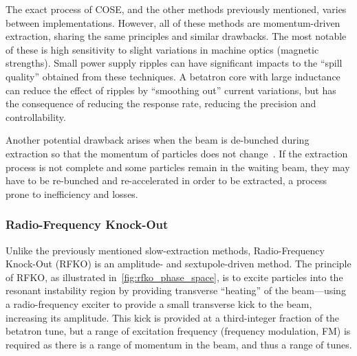 \documentclass[11pt]{report}
\begin{document}
The exact process of COSE, and the other methods previously mentioned, varies between implementations. However, all of these methods are momentum-driven extraction, sharing the same principles and similar drawbacks. The most notable of these is high sensitivity to slight variations in machine optics (magnetic strengths). Small power supply ripples can have significant impacts to the ``spill quality'' obtained from these techniques. A betatron core with large inductance can reduce the effect of ripples by ``smoothing out'' current variations, but has the consequence of reducing the response rate, reducing the precision and controllability. 

Another potential drawback arises when the beam is de-bunched during extraction so that the momentum of particles does not change~\cite{brown:ripples}. If the extraction process is not complete and some particles remain in the waiting beam, they may have to be re-bunched and re-accelerated in order to be extracted, a process prone to inefficiency and losses.


%
%
%
%
%



\subsubsection{Radio-Frequency Knock-Out}\label{sec:rfko}


Unlike the previously mentioned slow-extraction methods, Radio-Frequency Knock-Out (RFKO) is an amplitude- and sextupole-driven method. The principle of RFKO, as illustrated in~\autoref{fig:rfko_phase_space}, is to excite particles into the resonant instability region by providing transverse ``heating'' of the beam---using a radio-frequency exciter to provide a small transverse kick to the beam, increasing its amplitude. This kick is provided at a third-integer fraction of the betatron tune, but a range of excitation frequency (frequency modulation, FM) is required as there is a range of momentum in the beam, and thus a range of tunes. 
\end{document}
